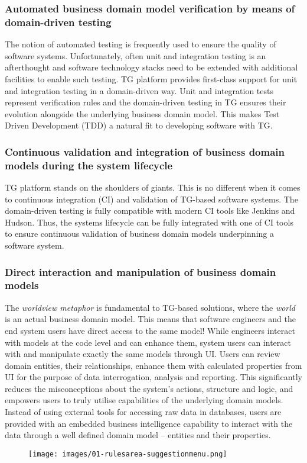 \documentclass[a4paper,10pt,twocolumn,oneside,openright,final]{memoir}
\begin{document}
\subsubsection*{Automated business domain model verification by means of domain-driven testing}
	The notion of automated testing is frequently used to ensure the quality of software systems.
	Unfortunately, often unit and integration testing is an afterthought and software technology stacks need to be extended with additional facilities to enable such testing.
	TG platform provides first-class support for unit and integration testing in a domain-driven way.
	Unit and integration tests represent verification rules and the domain-driven testing in TG ensures their evolution alongside the underlying business domain model.
	This makes Test Driven Development (TDD) a natural fit to developing software with TG.
	
\subsubsection*{Continuous validation and integration of business domain models during the system lifecycle}
	TG platform stands on the shoulders of giants.
	This is no different when it comes to continuous integration (CI) and validation of TG-based software systems.
	The domain-driven testing is fully compatible with modern CI tools like Jenkins and Hudson.
	Thus, the systems lifecycle can be fully integrated with one of CI tools to ensure continuous validation of business domain models underpinning a software system.

\subsubsection*{Direct interaction and manipulation of business domain models}
	The \emph{worldview metaphor} is fundamental to TG-based solutions, where the \emph{world} is an actual business domain model.
	This means that software engineers and the end system users have direct access to the same model!
	While engineers interact with models at the code level and can enhance them, system users can interact with and manipulate exactly the same models through UI.
	Users can review domain entities, their relationships, enhance them with calculated properties from UI for the purpose of data interrogation, analysis and reporting.
	This significantly reduces the misconceptions about the system's actions, structure and logic, and empowers users to truly utilise capabilities of the underlying domain models.
	Instead of using external tools for accessing raw data in databases, users are provided with an embedded business intelligence capability to interact with the data through a well defined domain model -- entities and their properties.
	\begin{figure}[!h]
  		\centering
  		\texttt{[image: images/01-rulesarea-suggestionmenu.png]}  
		\vspace{-30pt} 
  	\end{figure}
\end{document}
